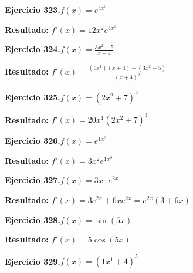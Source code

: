 \documentclass[10pt,a4paper]{article}
\begin{document}
\begin{ejbox}
\textbf{Ejercicio 323.}\quad $f(x) = e^{4x^{3}}$
\end{ejbox}

\begin{solbox}
\textbf{Resultado:} \(\displaystyle f'(x) = 12x^{2}e^{4x^{3}}\)
\end{solbox}

\begin{ejbox}
\textbf{Ejercicio 324.}\quad $f(x) = \frac{3x^{2} -5}{x + 4}$
\end{ejbox}

\begin{solbox}
\textbf{Resultado:} \(\displaystyle f'(x) = \frac{(6x^{1})(x+4) - (3x^{2} -5)}{(x+4)^2}\)
\end{solbox}

\newpage
\begin{ejbox}
\textbf{Ejercicio 325.}\quad $f(x) = (2x^{2} +7)^{5}$
\end{ejbox}

\begin{solbox}
\textbf{Resultado:} \(\displaystyle f'(x) = 20x^{1}(2x^{2} +7)^{4}\)
\end{solbox}

\begin{ejbox}
\textbf{Ejercicio 326.}\quad $f(x) = e^{1x^{3}}$
\end{ejbox}

\begin{solbox}
\textbf{Resultado:} \(\displaystyle f'(x) = 3x^{2}e^{1x^{3}}\)
\end{solbox}

\begin{ejbox}
\textbf{Ejercicio 327.}\quad $f(x) = 3x \cdot e^{2x}$
\end{ejbox}

\begin{solbox}
\textbf{Resultado:} \(\displaystyle f'(x) = 3e^{2x} + 6xe^{2x} = e^{2x}(3 + 6x)\)
\end{solbox}

\newpage
\begin{ejbox}
\textbf{Ejercicio 328.}\quad $f(x) = \sin(5x)$
\end{ejbox}

\begin{solbox}
\textbf{Resultado:} \(\displaystyle f'(x) = 5\cos(5x)\)
\end{solbox}

\begin{ejbox}
\textbf{Ejercicio 329.}\quad $f(x) = (1x^{1} +4)^{5}$
\end{ejbox}
\end{document}
